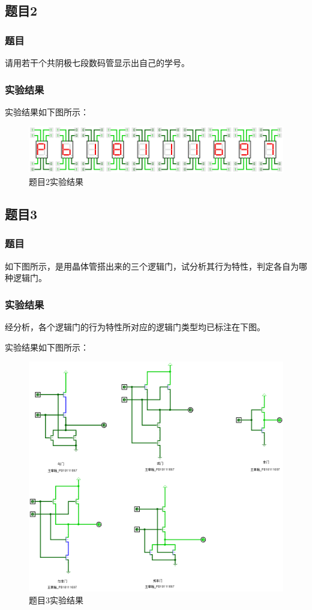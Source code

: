 \documentclass[UTF8]{article}
\begin{document}
	
	\subsection{题目2}
	\subsubsection{题目}
	请用若干个共阴极七段数码管显示出自己的学号。\par
	\subsubsection{实验结果}
	实验结果如下图所示：
	\begin{figure}[H]
		\centering
		\includegraphics[scale=0.4]{2.png}
		\caption{题目2实验结果}
		\label{2}
	\end{figure}
	
	\subsection{题目3}
	\subsubsection{题目}
	如下图所示，是用晶体管搭出来的三个逻辑门，试分析其行为特性，判定各自为哪种逻辑门。 \par
	\subsubsection{实验结果}
	经分析，各个逻辑门的行为特性所对应的逻辑门类型均已标注在下图。\par
	实验结果如下图所示：
	\begin{figure}[H]
		\centering
		\includegraphics[scale=0.25]{3.png}
		\caption{题目3实验结果}
		\label{3}
	\end{figure}
	
\end{document}
